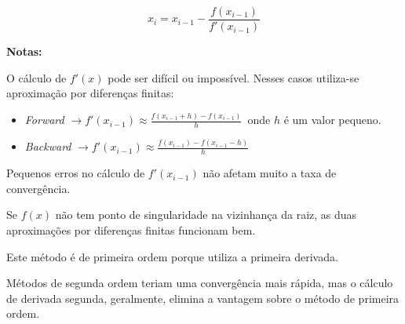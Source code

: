 \[\displaystyle x_{i} = x_{i-1} - \frac{f(x_{i-1})}{f'(x_{i-1})}\]

\textbf{Notas:}

\begin{enumerar}
 \item O cálculo de $f'(x)$ pode ser difícil ou impossível. Nesses casos utiliza-se aproximação por diferenças finitas:

 \begin{itemize}
  \item \textit{Forward} $\displaystyle \rightarrow f'(x_{i-1}) \approx \frac{f(x_{i-1} + h) - f(x_{i-1})}{h} \, $ onde $h$ é um valor pequeno.

  \item \textit{Backward} $\displaystyle \rightarrow f'(x_{i-1}) \approx \frac{f(x_{i-1}) - f(x_{i-1} - h)}{h}$
 \end{itemize}

 \item Pequenos erros no cálculo de $f'(x_{i-1})$ não afetam muito a taxa de convergência.

 \item Se $f(x)$ não tem ponto de singularidade na vizinhança da raiz, as duas aproximações por diferenças finitas funcionam bem.

 \item Este método é de primeira ordem porque utiliza a primeira derivada.

 \item Métodos de segunda ordem teriam uma convergência mais rápida, mas o cálculo de derivada segunda, geralmente, elimina a vantagem sobre o método de primeira ordem.

\end{enumerar}

